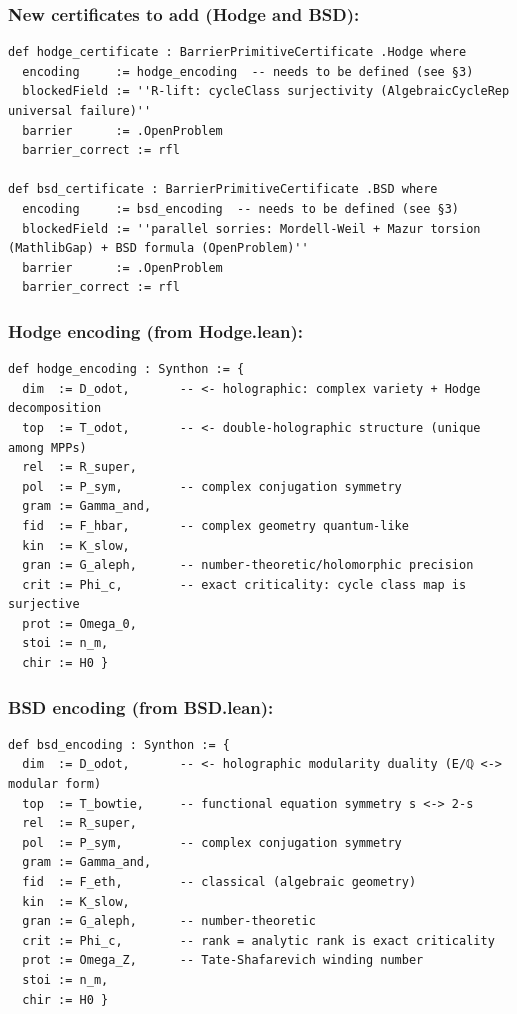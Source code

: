 \documentclass[12pt,a4paper]{article}
\begin{document}
\subsubsection{\textbf{New certificates to add (Hodge and BSD):}}

\begin{lstlisting}[language=lean]
def hodge_certificate : BarrierPrimitiveCertificate .Hodge where
  encoding     := hodge_encoding  -- needs to be defined (see §3)
  blockedField := ''R-lift: cycleClass surjectivity (AlgebraicCycleRep universal failure)''
  barrier      := .OpenProblem
  barrier_correct := rfl

def bsd_certificate : BarrierPrimitiveCertificate .BSD where
  encoding     := bsd_encoding  -- needs to be defined (see §3)
  blockedField := ''parallel sorries: Mordell-Weil + Mazur torsion (MathlibGap) + BSD formula (OpenProblem)''
  barrier      := .OpenProblem
  barrier_correct := rfl
\end{lstlisting}

\subsubsection{Hodge encoding (from Hodge.lean):}

\begin{lstlisting}[language=lean]
def hodge_encoding : Synthon := {
  dim  := D_odot,       -- <- holographic: complex variety + Hodge decomposition
  top  := T_odot,       -- <- double-holographic structure (unique among MPPs)
  rel  := R_super,
  pol  := P_sym,        -- complex conjugation symmetry
  gram := Gamma_and,
  fid  := F_hbar,       -- complex geometry quantum-like
  kin  := K_slow,
  gran := G_aleph,      -- number-theoretic/holomorphic precision
  crit := Phi_c,        -- exact criticality: cycle class map is surjective
  prot := Omega_0,
  stoi := n_m,
  chir := H0 }
\end{lstlisting}

\subsubsection{BSD encoding (from BSD.lean):}

\begin{lstlisting}[language=lean]
def bsd_encoding : Synthon := {
  dim  := D_odot,       -- <- holographic modularity duality (E/ℚ <-> modular form)
  top  := T_bowtie,     -- functional equation symmetry s <-> 2-s
  rel  := R_super,
  pol  := P_sym,        -- complex conjugation symmetry
  gram := Gamma_and,
  fid  := F_eth,        -- classical (algebraic geometry)
  kin  := K_slow,
  gran := G_aleph,      -- number-theoretic
  crit := Phi_c,        -- rank = analytic rank is exact criticality
  prot := Omega_Z,      -- Tate-Shafarevich winding number
  stoi := n_m,
  chir := H0 }
\end{lstlisting}
\end{document}

